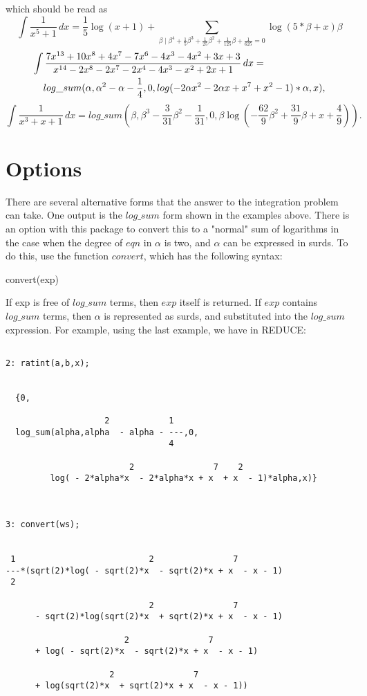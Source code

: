 which should be read as
\[
\int \frac{1}{x^5+1}\,dx = \frac{1}{5}\log(x+1)+\sum_{\beta \mid \beta^4+\frac{1}{5}\beta^3+\frac{1}{25}\beta^2+\frac{1}{125}\beta+\frac{1}{625}=0} \log(5*\beta+x)\beta \]
\vspace{5 mm}
\begin{eqnarray*}
\lefteqn{\int \frac{7x^{13}+10x^8+4x^7-7x^6-4x^3 -4x^2+3x+3}{x^{14}-2x^8-2x^7-2x^4-4x^3-x^2+2x+1} \, dx  =}  \\                                 
& &  log\_sum(\alpha,\alpha^2  -\alpha -\frac{1}{4},0,log( - 2\alpha x^2  - 2\alpha x + x^7  + x^2  - 1)*\alpha,x) ,
\end{eqnarray*}
\[ \int \frac{1}{x^3+x+1} \, dx = log\_sum(\beta,\beta^3-\frac{3}{31}\beta^2-\frac{1}{31},0,\beta \log(-\frac{62}{9}\beta^2+\frac{31}{9} \beta +x+\frac{4}{9})). \]

\section{Options}
There are several alternative forms that the answer to the integration problem can take. One output is the $log\_sum$ form shown in the examples above. There is an option with this package to convert this to a "normal" sum of logarithms in the case when the degree of $eqn$ in $\alpha$ is two, and $\alpha$ can be expressed in surds. To do this, use the function $convert$, which has the following syntax:
\begin{center}  convert(exp) \end{center}
If exp is free of $log\_sum$ terms, then $exp$ itself is returned. If $exp$ contains $log\_sum$ terms, then $\alpha$ is represented as surds, and substituted into the $log\_sum$ expression. For example, using the last example, we have in \small{REDUCE}:
\begin{verbatim}

2: ratint(a,b,x); 


  {0,

                    2            1
  log_sum(alpha,alpha  - alpha - ---,0,
                                 4

                         2                7    2
         log( - 2*alpha*x  - 2*alpha*x + x  + x  - 1)*alpha,x)} 



3: convert(ws);


 1                           2                7
---*(sqrt(2)*log( - sqrt(2)*x  - sqrt(2)*x + x  - x - 1)
 2

                             2                7
      - sqrt(2)*log(sqrt(2)*x  + sqrt(2)*x + x  - x - 1)

                        2                7
      + log( - sqrt(2)*x  - sqrt(2)*x + x  - x - 1)

                     2                7
      + log(sqrt(2)*x  + sqrt(2)*x + x  - x - 1))

\end{verbatim}
